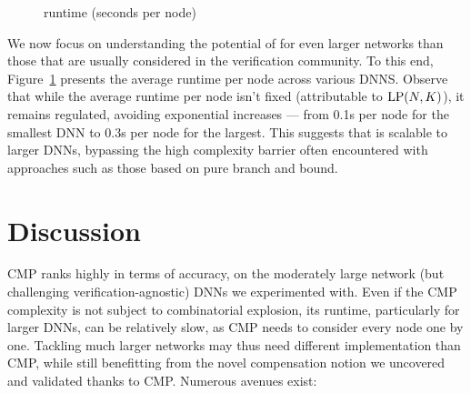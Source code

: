 \begin{figure}[b!]
	\centering
	\caption{runtime (seconds per node)}
	\label{fig2}
\end{figure}



We now focus on understanding the potential of {\toolname} for even larger networks than those that are usually considered in the verification community. To this end, Figure~\ref{fig2} presents the  average runtime per node across various DNNS. Observe that while  the average runtime per node isn't fixed (attributable to ${\textrm{LP}}(N,K)$), it remains regulated, avoiding exponential increases — from 0.1s per node for the smallest DNN to 0.3s per node for the largest. This suggests that {\toolname} is scalable to larger DNNs, bypassing the high complexity barrier often encountered with approaches such as those based on pure branch and bound.

\fi


\section{Discussion}
\label{Discussion}

CMP ranks highly in terms of accuracy, on the moderately large network (but challenging verification-agnostic) DNNs we experimented with. Even if the CMP complexity is not subject to combinatorial explosion, its runtime, particularly for larger DNNs, can be relatively slow, as CMP needs to consider every node one by one. Tackling much larger networks may thus need different implementation than CMP, while still benefitting from the novel compensation notion we uncovered and validated thanks to CMP. Numerous avenues exist:

